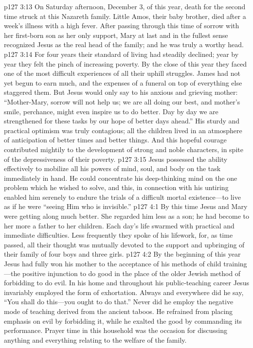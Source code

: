 \pc \vs p127 3:13 On Saturday afternoon, December 3, of this year, death for the second time struck at this Nazareth family. Little Amos, their baby brother, died after a week’s illness with a high fever. After passing through this time of sorrow with her first\hyp{}born son as her only support, Mary at last and in the fullest sense recognized Jesus as the real head of the family; and he was truly a worthy head.
\vs p127 3:14 For four years their standard of living had steadily declined; year by year they felt the pinch of increasing poverty. By the close of this year they faced one of the most difficult experiences of all their uphill struggles. James had not yet begun to earn much, and the expenses of a funeral on top of everything else staggered them. But Jesus would only say to his anxious and grieving mother: \textcolor{ubdarkred}{“Mother\hyp{}Mary, sorrow will not help us; we are all doing our best, and mother’s smile, perchance, might even inspire us to do better. Day by day we are strengthened for these tasks by our hope of better days ahead.”} His sturdy and practical optimism was truly contagious; all the children lived in an atmosphere of anticipation of better times and better things. And this hopeful courage contributed mightily to the development of strong and noble characters, in spite of the depressiveness of their poverty.
\vs p127 3:15 Jesus possessed the ability effectively to mobilize all his powers of mind, soul, and body on the task immediately in hand. He could concentrate his deep\hyp{}thinking mind on the one problem which he wished to solve, and this, in connection with his untiring  enabled him serenely to endure the trials of a difficult mortal existence---to live as if he were “seeing Him who is invisible.”
\vs p127 4:1 By this time Jesus and Mary were getting along much better. She regarded him less as a son; he had become to her more a father to her children. Each day’s life swarmed with practical and immediate difficulties. Less frequently they spoke of his lifework, for, as time passed, all their thought was mutually devoted to the support and upbringing of their family of four boys and three girls.
\vs p127 4:2 By the beginning of this year Jesus had fully won his mother to the acceptance of his methods of child training---the positive injunction to do good in the place of the older Jewish method of forbidding to do evil. In his home and throughout his public\hyp{}teaching career Jesus invariably employed the  form of exhortation. Always and everywhere did he say, \textcolor{ubdarkred}{“You shall do this---you ought to do that.”} Never did he employ the negative mode of teaching derived from the ancient taboos. He refrained from placing emphasis on evil by forbidding it, while he exalted the good by commanding its performance. Prayer time in this household was the occasion for discussing anything and everything relating to the welfare of the family.
